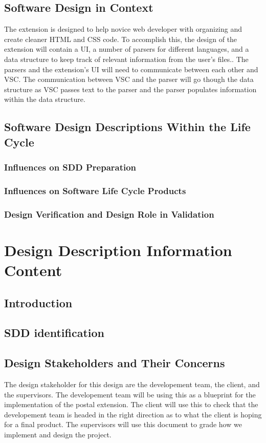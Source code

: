 \documentclass[letterpaper,10pt,titlepage,draftclsnofoot,onecolumn,onesided] {IEEEtran}
\begin{document}
\subsection{Software Design in Context}
The extension is designed to help novice web developer with organizing and create cleaner HTML and CSS code. 
To accomplish this, the design of the extension will contain a UI, a number of parsers for different languages, and a data structure to keep track of relevant information from the user's files..
The parsers and the extension's UI will need to communicate between each other and VSC.
The communication between VSC and the parser will go though the data structure as VSC passes text to the parser and the parser populates information within the data structure.

\subsection{Software Design Descriptions Within the Life Cycle}
\subsubsection{Influences on SDD Preparation}
\subsubsection{Influences on Software Life Cycle Products}
\subsubsection{Design Verification and Design Role in Validation}

\section{Design Description Information Content}

\subsection{Introduction}

\subsection{SDD identification}

\subsection{Design Stakeholders and Their Concerns}
The design stakeholder for this design are the developement team, the client, and the supervisors.
The developement team will be using this as a blueprint for the implementation of the postal extension. 
The client will use this to check that the developement team is headed in the right direction as to what the client is hoping for a final product.
The supervisors will use this document to grade how we implement and design the project.
\end{document}
